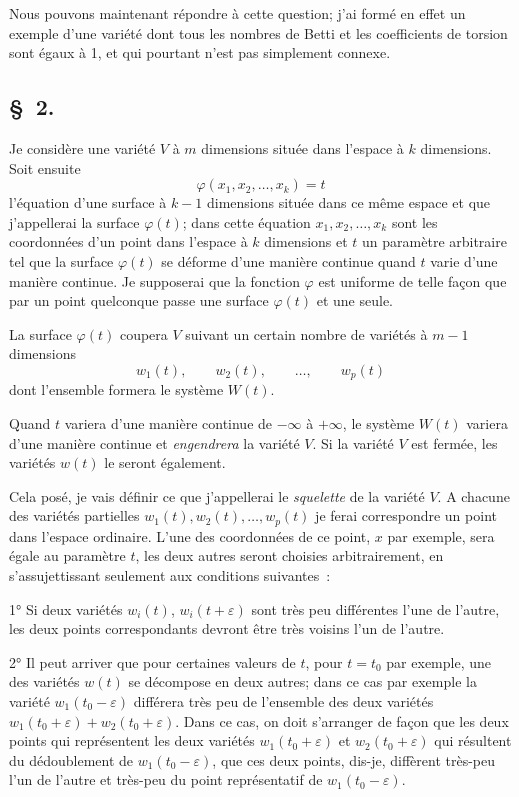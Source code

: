 \documentclass{article}
\begin{document}
Nous pouvons maintenant répondre à cette question; j'ai formé en effet un exemple d'une variété dont tous les nombres de Betti et les coefficients de torsion sont égaux à 1, et qui pourtant n'est pas simplement connexe.

\subsection*{\S~2.}

Je considère une variété $V$ à $m$ dimensions située dans l'espace à $k$ dimensions. Soit ensuite
\[ \varphi(x_{1}, x_{2}, \ldots, x_{k}) = t \]
l'équation d'une surface à $k - 1$ dimensions située dans ce même espace et que j'appellerai la surface $\varphi(t)$; dans cette équation $x_{1}, x_{2}, \ldots, x_{k}$ sont les coordonnées d'un point dans l'espace à $k$ dimensions et $t$ un paramètre arbitraire tel que la surface $\varphi(t)$ se déforme d'une manière continue quand $t$ varie d'une manière continue. Je supposerai que la fonction $\varphi$ est uniforme de telle façon que par un point quelconque passe une surface $\varphi(t)$ et une seule.

La surface $\varphi(t)$ coupera $V$ suivant un certain nombre de variétés à $m - 1$ dimensions
\[ w_{1}(t), \qquad w_{2}(t), \qquad \ldots, \qquad w_{p}(t) \]
dont l'ensemble formera le système $W(t)$.

Quand $t$ variera d'une manière continue de $-\infty$ à $+\infty$, le système $W(t)$ variera d'une manière continue et \emph{engendrera} la variété $V$. Si la variété $V$ est fermée, les variétés $w(t)$ le seront également.

Cela posé, je vais définir ce que j'appellerai le \emph{squelette} de la variété $V$. A chacune des variétés partielles $w_{1}(t), w_{2}(t), \ldots, w_{p}(t)$ je ferai correspondre un point dans l'espace ordinaire. L'une des coordonnées de ce point, $x$ par exemple, sera égale au paramètre $t$, les deux autres seront choisies arbitrairement, en s'assujettissant seulement aux conditions suivantes~:


1° Si deux variétés $w_{i}(t)$, $w_{i}(t + \varepsilon)$ sont très peu différentes l'une de l'autre, les deux points correspondants devront être très voisins l'un de l'autre.

2° Il peut arriver que pour certaines valeurs de $t$, pour $t = t_{0}$ par exemple, une des variétés $w(t)$ se décompose en deux autres; dans ce cas par exemple la variété $w_{1}(t_{0} - \varepsilon)$ différera très peu de l'ensemble des deux variétés $w_{1}(t_{0} + \varepsilon) + w_{2}(t_{0} + \varepsilon)$. Dans ce cas, on doit s'arranger de façon que les deux points qui représentent les deux variétés $w_{1}(t_{0} + \varepsilon)$ et $w_{2}(t_{0} + \varepsilon)$ qui résultent du dédoublement de $w_{1}(t_{0} - \varepsilon)$, que ces deux points, dis-je, diffèrent très-peu l'un de l'autre et très-peu du point représentatif de $w_{1}(t_{0} - \varepsilon)$.
\end{document}

